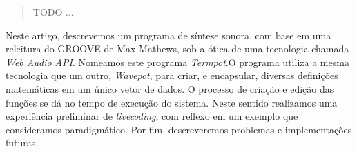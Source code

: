 \documentclass[12pt]{article}
\begin{document}
 

\maketitle


\begin{abstract}
TODO ...
\end{abstract}

\begin{resumo} 
Neste artigo, descrevemos um programa de síntese sonora, com base em uma releitura do GROOVE de Max Mathews, sob a ótica de uma tecnologia chamada \emph{Web Audio API}. Nomeamos este programa \emph{Termpot}.O programa utiliza a mesma tecnologia que um outro, \emph{Wavepot}, para  criar, e encapsular, diversas definições matemáticas em um único vetor de dados. O processo de criação e edição das funções se dá no tempo de execução do sistema. Neste sentido realizamos uma experiência preliminar de \emph{livecoding}, com reflexo em um exemplo que consideramos paradigmático. Por fim, descreveremos problemas e implementações futuras. 
\end{resumo}



%

%
%
 


\end{document}
